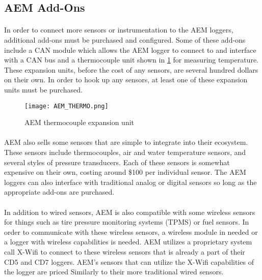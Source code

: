 \subsection{AEM Add-Ons}

\paragraph{}
In order to connect more sensors or instrumentation to the AEM loggers, additional add-ons must be purchased and configured.
Some of these add-ons include a CAN module which allows the AEM logger to connect to and interface with a CAN bus and a thermocouple unit shown in \cref{fig:AEM_THERMO} for measuring temperature.
These expansion units, before the cost of any sensors, are several hundred dollars on their own.
In order to hook up any sensors, at least one of these expansion units must be purchased.

\begin{figure}[H]
	\centering
	\texttt{[image: AEM\_THERMO.png]}
	\caption{AEM thermocouple expansion unit}
	\label{fig:AEM_THERMO}
\end{figure}

\paragraph{}
AEM also sells some sensors that are simple to integrate into their ecosystem.
These sensors include thermocouples, air and water temperature sensors, and several styles of pressure transducers.
Each of these sensors is somewhat expensive on their own, costing around \$100 per individual sensor.
The AEM loggers can also interface with traditional analog or digital sensors so long as the appropriate add-ons are purchased.

\paragraph{}
In addition to wired sensors, AEM is also compatible with some wireless sensors for things such as tire pressure monitoring systems (TPMS) or fuel sensors.
In order to communicate with these wireless sensors, a wireless module in needed or a logger with wireless capabilities is needed.
AEM utilizes a proprietary system call X-Wifi to connect to these wireless sensors that is already a part of their CD5 and CD7 loggers.
AEM's sensors that can utilize the X-Wifi capabilities of the logger are priced Similarly to their more traditional wired sensors.

